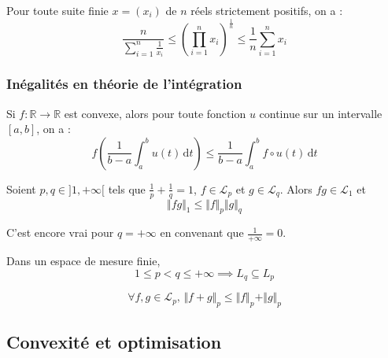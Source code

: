 	
	\begin{proposition}
		Pour toute suite finie $x = (x_i)$ de $n$ réels strictement positifs, on a :
		\[ \frac{n}{\sum_{i=1}^n \frac{1}{x_i}} \leq \left( \prod_{i=1}^n x_i \right)^{\frac{1}{n}} \leq \frac{1}{n} \sum_{i=1}^n x_i \]
	\end{proposition}
	
	\subsubsection{Inégalités en théorie de l'intégration}
	
	\begin{proposition}
		Si $f : \mathbb{R} \rightarrow \mathbb{R}$ est convexe, alors pour toute fonction $u$ continue sur un intervalle $[a, b]$, on a :
		\[ f \left( \frac{1}{b-a} \int_a^b u(t) \, \mathrm{d}t \right) \leq \frac{1}{b-a} \int_a^b f \circ u (t) \, \mathrm{d}t \]
	\end{proposition}
	
	
	\begin{theorem}
		Soient $p, q \in ]1, +\infty[$ tels que $\frac{1}{p} + \frac{1}{q} = 1$, $f \in \mathcal{L}_p$ et $g \in \mathcal{L}_q$. Alors $fg \in \mathcal{L}_1$ et
		\[ \Vert fg \Vert_1 \leq \Vert f \Vert_p \Vert g \Vert_q \]
	\end{theorem}
	
	\begin{remark}
		C'est encore vrai pour $q = +\infty$ en convenant que $\frac{1}{+\infty} = 0$.
	\end{remark}
	
	\begin{application}
		Dans un espace de mesure finie,
		\[ 1 \leq p < q \leq +\infty \implies L_q \subseteq L_p \]
	\end{application}
	
	\begin{theorem}
		\[ \forall f, g \in \mathcal{L}_p, \, \Vert f + g \Vert_p \leq \Vert f \Vert_p + \Vert g \Vert_p \]
	\end{theorem}
	
	\subsection{Convexité et optimisation}
	
